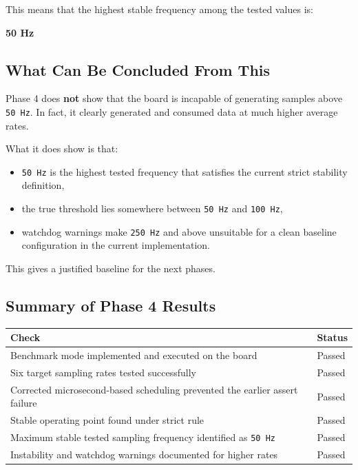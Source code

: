 \documentclass[12pt,a4paper]{article}
\begin{document}
This means that the highest stable frequency among the tested values is:

\begin{center}
\textbf{50 Hz}
\end{center}

\subsection{What Can Be Concluded From This}

Phase 4 does \textbf{not} show that the board is incapable of generating
samples above \texttt{50 Hz}. In fact, it clearly generated and consumed data
at much higher average rates.

What it does show is that:

\begin{itemize}
    \item \texttt{50 Hz} is the highest tested frequency that satisfies the
    current strict stability definition,
    \item the true threshold lies somewhere between \texttt{50 Hz} and
    \texttt{100 Hz},
    \item watchdog warnings make \texttt{250 Hz} and above unsuitable for a
    clean baseline configuration in the current implementation.
\end{itemize}

This gives a justified baseline for the next phases.

\subsection{Summary of Phase 4 Results}

\begin{longtable}{|>{\raggedright\arraybackslash}p{}|>{\raggedright\arraybackslash}p{}|}
\hline
\textbf{Check} & \textbf{Status} \\
\hline
Benchmark mode implemented and executed on the board & Passed \\
\hline
Six target sampling rates tested successfully & Passed \\
\hline
Corrected microsecond-based scheduling prevented the earlier assert failure & Passed \\
\hline
Stable operating point found under strict rule & Passed \\
\hline
Maximum stable tested sampling frequency identified as \texttt{50 Hz} & Passed \\
\hline
Instability and watchdog warnings documented for higher rates & Passed \\
\hline
\end{longtable}
\end{document}
